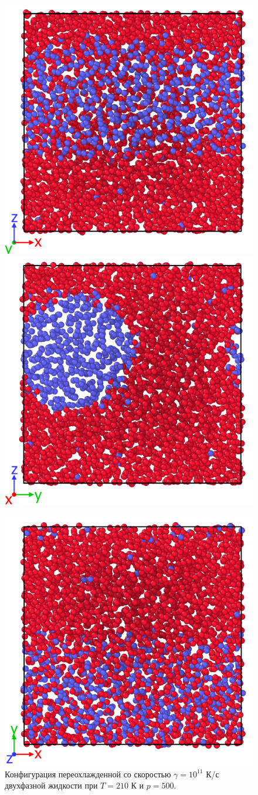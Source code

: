 \begin{figure}[H]
    \centering
    \begin{minipage}{\linewidth}
    \includegraphics[width=.49\linewidth]{figures/cool1.png}
    \includegraphics[width=.49\linewidth]{figures/cool2.png}
    \end{minipage}
    \begin{minipage}{\linewidth}
        \centering
        \includegraphics[width=.5\linewidth]{figures/cool3.png}
    \end{minipage}
    \caption{Конфигурация переохлажденной со скоростью $\gamma=10^{11}$ К/с двухфазной жидкости при $T=210$ К и $p=500$.}
    \label{fig3.4}
\end{figure}

